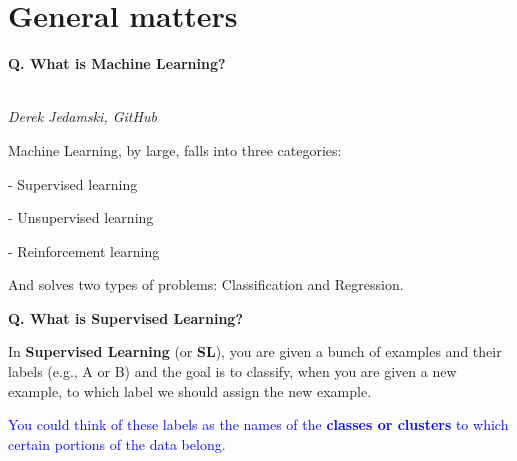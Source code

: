 \section{General matters}
\begin{frame}[fragile]{\textbf{Q. What is Machine Learning?}}
  \begin{wideitemize}
    \item {}\\\hspace{25em}\textit{Derek Jedamski, GitHub}
    \item Machine Learning, by large, falls into three categories:\vspace{.4em}
    \begin{wideitemize}
      \item[-] Supervised learning
      \item[-] Unsupervised learning
      \item[-] Reinforcement learning
    \end{wideitemize}
    \item And solves two types of problems: Classification and Regression.
  \end{wideitemize}
\end{frame}

\begin{frame}[fragile]{\textbf{Q. What is Supervised Learning?}}
  \begin{wideitemize}
    \item In \textbf{Supervised Learning} (or \textbf{SL}), you are given a
    bunch of examples and their labels (e.g., A or B) and the goal is to
    classify, when you are given a new example, to which label we
    should assign the new example.
    \item \textcolor{blue}{You could think of these labels as the names of the
    \textbf{classes or clusters} to which certain portions of the data belong.}
  \end{wideitemize}
\end{frame}

